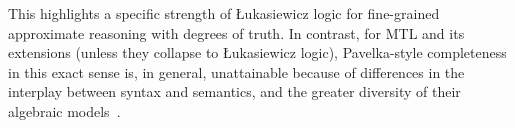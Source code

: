This highlights a specific strength of Łukasiewicz logic for fine-grained approximate reasoning with degrees of truth. In contrast, for MTL and its extensions (unless they collapse to Łukasiewicz logic), Pavelka-style completeness in this exact sense is, in general, unattainable because of differences in the interplay between syntax and semantics, and the greater diversity of their algebraic models~\cite[Rem. 4.1.22, Rem. 4.2.22]{Hajek1998}.
